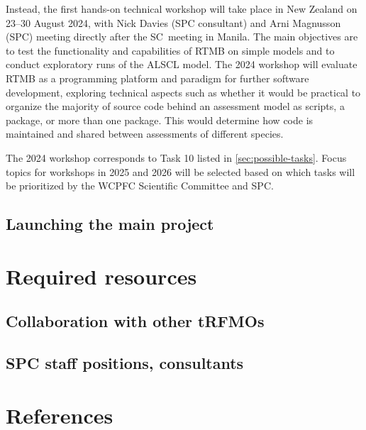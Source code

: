\documentclass{SCreport}
\begin{document}
Instead, the first hands-on technical workshop will take place in New Zealand on
23--30 August 2024, with Nick Davies (SPC consultant) and Arni Magnusson (SPC)
meeting directly after the SC~meeting in Manila. The main objectives are to test
the functionality and capabilities of RTMB on simple models and to conduct
exploratory runs of the ALSCL model. The 2024 workshop will evaluate RTMB as a
programming platform and paradigm for further software development, exploring
technical aspects such as whether it would be practical to organize the majority
of source code behind an assessment model as scripts, a package, or more than
one package. This would determine how code is maintained and shared between
assessments of different species.

The 2024 workshop corresponds to Task 10 listed in \autoref{sec:possible-tasks}.
Focus topics for workshops in 2025 and 2026 will be selected based on which
tasks will be prioritized by the WCPFC Scientific Committee and SPC.

\subsection{Launching the main project}

\section{Required resources}

\subsection{Collaboration with other tRFMOs}

\subsection{SPC staff positions, consultants}

\section{References}

\sloppy\setlength{}
\end{document}
